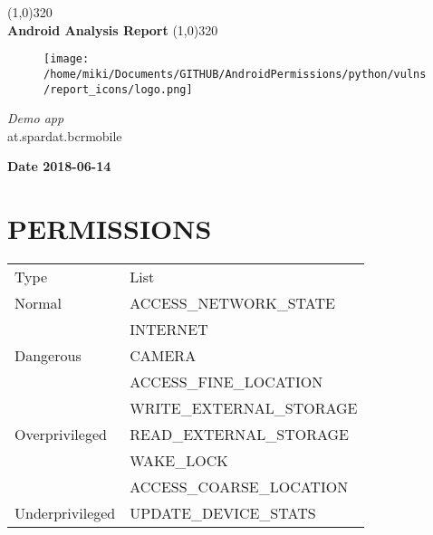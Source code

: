 \documentclass[12p]{article}
\begin{document}
\begin{titlepage}
\begin{center}
\line(1,0){320}\\
[0.25in]
\huge{\bfseries Android Analysis Report}
\line(1,0){320}\\
[0.5in]
\begin{figure}[H]
	\centering
	\texttt{[image: /home/miki/Documents/GITHUB/AndroidPermissions/python/vulns/report\_icons/logo.png]}
\end{figure}
\textsl{\LARGE Demo app}\\
\textsf{\LARGE at.spardat.bcrmobile}\\
[2.5in]
\end{center}
\begin{flushright}
\textbf{\large Date 2018-06-14}
\end{flushright}
\end{titlepage}
\tableofcontents
\thispagestyle{empty}
\cleardoublepage
\setcounter{page}{1}
\section{PERMISSIONS}
	\begin{longtable}{p{3cm} p{10cm} }
	\rowcolor{grannysmithapple!70} Type & List \\
Normal &  ACCESS\_NETWORK\_STATE \\ 
 &  INTERNET \\ 
\hline
Dangerous &  CAMERA \\ 
 &  ACCESS\_FINE\_LOCATION \\ 
 &  WRITE\_EXTERNAL\_STORAGE \\ 
\hline
Overprivileged &  READ\_EXTERNAL\_STORAGE \\ 
 &  WAKE\_LOCK \\ 
 &  ACCESS\_COARSE\_LOCATION \\ 
\hline
Underprivileged &  UPDATE\_DEVICE\_STATS \\ 
\hline
\hline
	\end{longtable}
\end{document}
